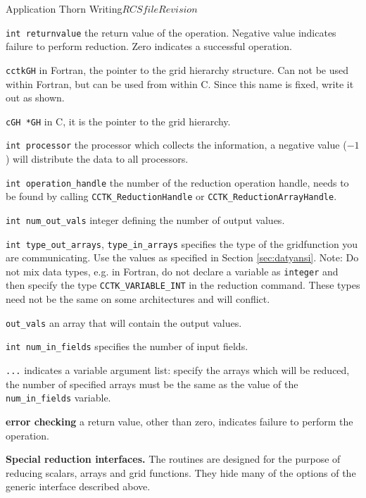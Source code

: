 \begin{cactuspart}{Application Thorn Writing}{$RCSfile$}{$Revision$}
\begin{Lentry}
\item[\texttt{int returnvalue}] 
the return value of the operation. Negative
value indicates failure to perform reduction.
Zero indicates a successful operation.
\item[\texttt{cctkGH}]
in Fortran, the pointer to the grid hierarchy
structure. Can not be used within Fortran, but
can be used from within 
C. Since this name is fixed, write it out as shown.
\item[\texttt{cGH *GH}]
 in C, it is the pointer to the grid hierarchy.
\item[\texttt{int processor}] 
the processor which collects the
information, a negative value ($-1$) will distribute the data to all
processors.
\item[\texttt{int operation\_handle}] the number of the reduction operation
                handle, needs to be found by calling \texttt{CCTK\_ReductionHandle} or
                \texttt{CCTK\_ReductionArrayHandle}.
\item[\texttt{int num\_out\_vals}] integer defining the number of output values.
\item[\texttt{int type\_out\_arrays}, \texttt{type\_in\_arrays}] 
specifies the type of the gridfunction 
you are communicating. Use the values as specified in Section
\ref{sec:datyansi}. Note: Do not mix data types, e.g. in
Fortran, do not declare a variable as \texttt{integer} and then specify  
the type \texttt{CCTK\_VARIABLE\_INT} in the reduction command. These
types need not be the same on some architectures and will conflict.
\item[\texttt{out\_vals}] an array that will contain the output values.
\item[\texttt{int num\_in\_fields}] specifies the number of input fields.
\item[\texttt{...}] indicates a variable argument list: specify the arrays which will be reduced, the number of
specified arrays must be the same as the value of the {\tt
num\_in\_fields} variable.
\item[{\bf error checking}] a return value, other than zero, indicates
failure to perform the operation.
\end{Lentry}

\vskip 0.25cm


{\bf Special reduction interfaces.} The routines are designed for the purpose of reducing scalars, arrays
and grid functions. They hide many of the options of the generic
interface described above.


\end{cactuspart}
